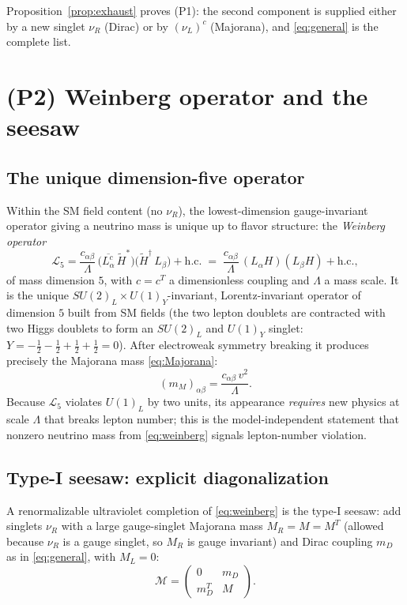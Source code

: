 \documentclass[12pt]{article}
\theoremstyle{definition}
\newcommand{\nuL}{\nu_L}
\newcommand{\nuR}{\nu_R}
\begin{document}
Proposition~\ref{prop:exhaust} proves (P1): the second component is
supplied either by a new singlet $\nuR$ (Dirac) or by $(\nuL)^c$
(Majorana), and \eqref{eq:general} is the complete list.

\section{(P2) Weinberg operator and the seesaw}

\subsection{The unique dimension-five operator}
Within the SM field content (no $\nuR$), the lowest-dimension
gauge-invariant operator giving a neutrino mass is unique up to flavor
structure: the \emph{Weinberg operator}
\begin{equation}\label{eq:weinberg}
\mathcal L_5=\frac{c_{\alpha\beta}}{\Lambda}\,
\big(\overline{L_\alpha^c}\,\widetilde H^{*}\big)
\big(\widetilde H^{\dagger}\,L_\beta\big)+\text{h.c.}
\;=\;\frac{c_{\alpha\beta}}{\Lambda}\,(L_\alpha H)(L_\beta H)+\text{h.c.},
\end{equation}
of mass dimension $5$, with $c=c^T$ a dimensionless coupling and
$\Lambda$ a mass scale. It is the unique
$SU(2)_L\times U(1)_Y$-invariant, Lorentz-invariant operator of dimension
$5$ built from SM fields (the two lepton doublets are contracted with two
Higgs doublets to form an $SU(2)_L$ and $U(1)_Y$ singlet:
$Y=-\tfrac12-\tfrac12+\tfrac12+\tfrac12=0$). After electroweak symmetry
breaking it produces precisely the Majorana mass \eqref{eq:Majorana}:
\begin{equation}\label{eq:wmass}
(m_M)_{\alpha\beta}=\frac{c_{\alpha\beta}\,v^2}{\Lambda}.
\end{equation}
Because $\mathcal L_5$ violates $U(1)_L$ by two units, its appearance
\emph{requires} new physics at scale $\Lambda$ that breaks lepton number;
this is the model-independent statement that nonzero neutrino mass from
\eqref{eq:weinberg} signals lepton-number violation.

\subsection{Type-I seesaw: explicit diagonalization}
A renormalizable ultraviolet completion of \eqref{eq:weinberg} is the
type-I seesaw: add singlets $\nuR$ with a large gauge-singlet Majorana
mass $M_R=M=M^T$ (allowed because $\nuR$ is a gauge singlet, so $M_R$ is
gauge invariant) and Dirac coupling $m_D$ as in \eqref{eq:general}, with
$M_L=0$:
\begin{equation}\label{eq:seesawM}
\mathcal M=\begin{pmatrix}0 & m_D\\ m_D^T & M\end{pmatrix}.
\end{equation}
\end{document}
